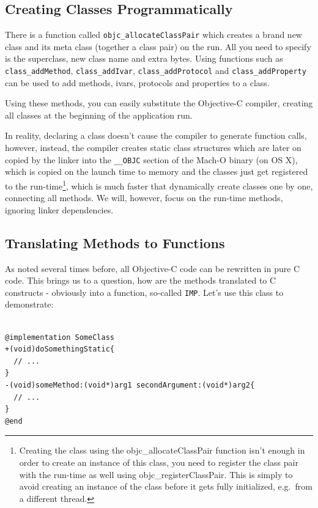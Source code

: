 \subsection{Creating Classes Programmatically}

There is a function called \verb=objc_allocateClassPair= which creates a brand new class and its meta class (together a class pair) on the run. All you need to specify is the superclass, new class name and extra bytes. Using functions such as \verb=class_addMethod=, \verb=class_addIvar=, \verb=class_addProtocol= and \verb=class_addProperty= can be used to add methods, ivars, protocols and properties to a class.

Using these methods, you can easily substitute the Objective-C compiler, creating all classes at the beginning of the application run. 

In reality, declaring a class doesn't cause the compiler to generate function calls, however, instead, the compiler creates static class structures which are later on copied by the linker into the \verb=__OBJC= section of the Mach-O binary (on OS X), which is copied on the launch time to memory and the classes just get registered to the run-time\footnote{Creating the class using the objc\_allocateClassPair function isn't enough in order to create an instance of this class, you need to register the class pair with the run-time as well using objc\_registerClassPair. This is simply to avoid creating an instance of the class before it gets fully initialized, e.g.\ from a different thread.}, which is much faster that dynamically create classes one by one, connecting all methods. We will, however, focus on the run-time methods, ignoring linker dependencies.

\subsection{Translating Methods to Functions}

As noted several times before, all Objective-C code can be rewritten in pure C code. This brings us to a question, how are the methods translated to C constructs - obviously into a function, so-called \verb=IMP=. Let's use this class to demonstrate:

\begin{verbatim}

@implementation SomeClass
+(void)doSomethingStatic{
  // ...
}
-(void)someMethod:(void*)arg1 secondArgument:(void*)arg2{
  // ...
}
@end

\end{verbatim}

